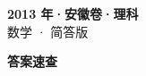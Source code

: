 \documentclass[zihao=-4, a4paper]{ctexart}
\begin{document}
\begin{center}
  {\Large\bfseries 2013 年·安徽卷·理科}\\[4pt]
  {\large 数学 · 简答版}
\end{center}
\medskip
{}

\clearpage
{}
\begin{center}{\Large\bfseries 答案速查}\end{center}
\medskip

\end{document}
